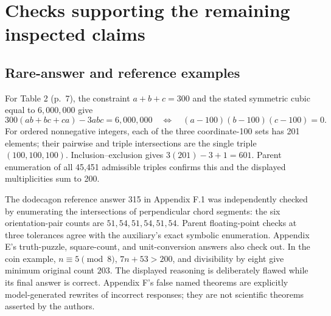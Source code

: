 \documentclass[10pt]{article}
\begin{document}
\section*{Checks supporting the remaining inspected claims}
\subsection*{Rare-answer and reference examples}
For Table 2 (p. 7), the constraint \(a+b+c=300\) and the stated symmetric cubic equal to \(6{,}000{,}000\) give \[300(ab+bc+ca)-3abc=6{,}000{,}000
\quad\Longleftrightarrow\quad
(a-100)(b-100)(c-100)=0 .\] For ordered nonnegative integers, each of the three coordinate-100 sets has 201 elements; their pairwise and triple intersections are the single triple \((100,100,100)\). Inclusion–exclusion gives \(3(201)-3+1=601\). Parent enumeration of all 45,451 admissible triples confirms this and the displayed multiplicities sum to 200.\par
The dodecagon reference answer 315 in Appendix F.1 was independently checked by enumerating the intersections of perpendicular chord segments: the six orientation-pair counts are \(51,54,51,54,51,54\). Parent floating-point checks at three tolerances agree with the auxiliary’s exact symbolic enumeration. Appendix E’s truth-puzzle, square-count, and unit-conversion answers also check out. In the coin example, \(n\equiv5\pmod8\), \(7n+53>200\), and divisibility by eight give minimum original count \(203\). The displayed reasoning is deliberately flawed while its final answer is correct. Appendix F’s false named theorems are explicitly model-generated rewrites of incorrect responses; they are not scientific theorems asserted by the authors.\par
\end{document}
